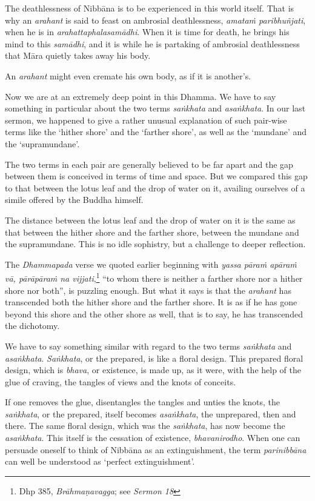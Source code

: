 The deathlessness of Nibbāna is to be experienced in this world itself. That is why an \emph{arahant} is said to feast on ambrosial deathlessness, \emph{amataṁ paribhuñjati}, when he is in \emph{arahattaphalasamādhi}. When it is time for death, he brings his mind to this \emph{samādhi}, and it is while he is partaking of ambrosial deathlessness that Māra quietly takes away his body.

An \emph{arahant} might even cremate his own body, as if it is another's.

Now we are at an extremely deep point in this Dhamma. We have to say something in particular about the two terms \emph{saṅkhata} and \emph{asaṅkhata}. In our last sermon, we happened to give a rather unusual explanation of such pair-wise terms like the `hither shore' and the `farther shore', as well as the `mundane' and the `supramundane'.

The two terms in each pair are generally believed to be far apart and the gap between them is conceived in terms of time and space. But we compared this gap to that between the lotus leaf and the drop of water on it, availing ourselves of a simile offered by the Buddha himself.

The distance between the lotus leaf and the drop of water on it is the same as that between the hither shore and the farther shore, between the mundane and the supramundane. This is no idle sophistry, but a challenge to deeper reflection.

The \emph{Dhammapada} verse we quoted earlier beginning with \emph{yassa pāraṁ apāraṁ vā, pārāpāraṁ na vijjati},\footnote{Dhp 385, \emph{Brāhmaṇavagga}; see \emph{Sermon 18}} ``to whom there is neither a farther shore nor a hither shore nor both'', is puzzling enough. But what it says is that the \emph{arahant} has transcended both the hither shore and the farther shore. It is as if he has gone beyond this shore and the other shore as well, that is to say, he has transcended the dichotomy.

We have to say something similar with regard to the two terms \emph{saṅkhata} and \emph{asaṅkhata}. \emph{Saṅkhata}, or the prepared, is like a floral design. This prepared floral design, which is \emph{bhava}, or existence, is made up, as it were, with the help of the glue of craving, the tangles of views and the knots of conceits.

If one removes the glue, disentangles the tangles and unties the knots, the \emph{saṅkhata}, or the prepared, itself becomes \emph{asaṅkhata}, the unprepared, then and there. The same floral design, which was the \emph{saṅkhata}, has now become the \emph{asaṅkhata}. This itself is the cessation of existence, \emph{bhavanirodho}. When one can persuade oneself to think of Nibbāna as an extinguishment, the term \emph{parinibbāna} can well be understood as `perfect extinguishment'.

